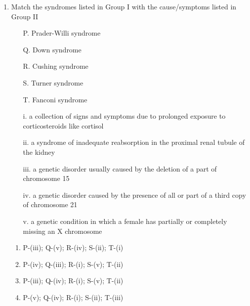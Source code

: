 \documentclass[journal,12pt,onecolumn]{IEEEtran}
\begin{document}
\begin{enumerate}
    \item \begin{minipage}{0.45\textwidth}
    Match the syndromes listed in Group I with the cause/symptoms listed in Group II
    \begin{itemize}
        \item[P.] Prader-Willi syndrome
        \item[Q.] Down syndrome
        \item[R.] Cushing syndrome
        \item[S.] Turner syndrome
        \item[T.] Fanconi syndrome
    \end{itemize}
    \end{minipage}
    \begin{minipage}{0.45\textwidth}
    \begin{itemize}
        \item[i.] a collection of signs and symptoms due to prolonged exposure to corticosteroids like cortisol
        \item[ii.] a syndrome of inadequate reabsorption in the proximal renal tubule of the kidney
        \item[iii.] a genetic disorder usually caused by the deletion of a part of chromosome 15
        \item[iv.] a genetic disorder caused by the presence of all or part of a third copy of chromosome 21
        \item[v.] a genetic condition in which a female has partially or completely missing an X chromosome
    \end{itemize}
    \end{minipage}
    \begin{enumerate}
        \item P-(iii); Q-(v); R-(iv); S-(ii); T-(i)
        \item P-(iv); Q-(iii); R-(i); S-(v); T-(ii)
        \item P-(iii); Q-(iv); R-(i); S-(v); T-(ii)
        \item P-(v); Q-(iv); R-(i); S-(ii); T-(iii)
    \end{enumerate}


\end{enumerate}
\end{document}
